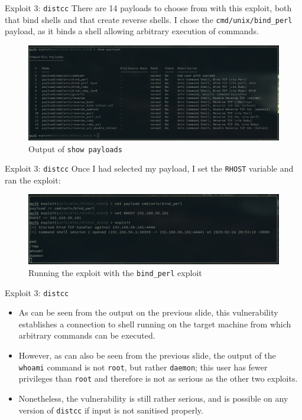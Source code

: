 \documentclass[]{beamer}
\begin{document}
\begin{frame}{Exploit 3: \texttt{distcc}}
There are 14 payloads to choose from with this exploit, both that bind shells and that create reverse shells.
I chose the \texttt{cmd/unix/bind\_perl} payload, as it binds a shell allowing arbitrary execution of commands.

\begin{figure}[H]
    \centering
    \includegraphics[width=\textwidth]{./images/distccpayloads.png}
    \caption{Output of \texttt{show payloads}}
\end{figure}
\end{frame}

\begin{frame}{Exploit 3: \texttt{distcc}}
Once I had selected my payload, I set the \texttt{RHOST} variable and ran the exploit:

\begin{figure}[H]
    \centering
    \includegraphics[width=\textwidth]{./images/distccexploit.png}
    \caption{Running the exploit with the \texttt{bind\_perl} exploit}
\end{figure}
\end{frame}

\begin{frame}{Exploit 3: \texttt{distcc}}
\begin{itemize}
    \item   As can be seen from the output on the previous slide, this vulnerability establishes a connection to shell running on the target machine from which arbitrary commands can be executed.
    \item   However, as can also be seen from the previous slide, the output of the \texttt{whoami} command is not \texttt{root}, but rather \texttt{daemon};
            this user has fewer privileges than \texttt{root} and therefore is not as serious as the other two exploits.
    \item   Nonetheless, the vulnerability is still rather serious, and is possible on any version of \texttt{distcc} if input is not sanitised properly.
\end{itemize}
\end{frame}
\end{document}
